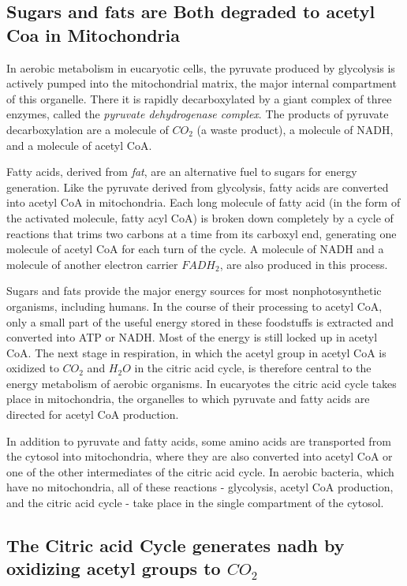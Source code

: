 \subsection{Sugars and fats are Both degraded to acetyl Coa in Mitochondria}

In aerobic metabolism in eucaryotic cells, the pyruvate produced by
glycolysis is actively pumped into the mitochondrial matrix, the major
internal compartment of this organelle. There it is
rapidly decarboxylated by a giant complex of three enzymes, called the
\textit{pyruvate dehydrogenase complex}. The products of pyruvate decarboxylation
are a molecule of $CO_2$ (a waste product), a molecule of NADH, and a
molecule of acetyl CoA.

Fatty acids, derived from \textit{fat}, are an alternative fuel to sugars for energy
generation. Like the pyruvate derived from glycolysis, fatty acids are converted
into acetyl CoA in mitochondria. Each long molecule of fatty acid
(in the form of the activated molecule, fatty acyl CoA) is broken down
completely by a cycle of reactions that trims two carbons at a time from
its carboxyl end, generating one molecule of acetyl CoA for each turn of
the cycle. A molecule of NADH and a molecule of another electron carrier
$FADH_2$, are also produced in this process.

Sugars and fats provide the major energy sources for most nonphotosynthetic
organisms, including humans. In the course of their processing to
acetyl CoA, only a small part of the useful energy stored in these foodstuffs
is extracted and converted into ATP or NADH. Most of the energy is
still locked up in acetyl CoA. The next stage in respiration, in which the
acetyl group in acetyl CoA is oxidized to $CO_2$ and $H_{2}O$ in the citric acid
cycle, is therefore central to the energy metabolism of aerobic organisms.
In eucaryotes the citric acid cycle takes place in mitochondria, the
organelles to which pyruvate and fatty acids are directed for acetyl CoA
production.

In addition to pyruvate and fatty acids, some amino acids are transported
from the cytosol into mitochondria, where they are also converted into
acetyl CoA or one of the other intermediates of the citric acid cycle.
In aerobic bacteria, which have no mitochondria, all of these reactions
- glycolysis, acetyl CoA production, and the citric acid cycle - take
place in the single compartment of the cytosol.

\subsection{The Citric acid Cycle generates nadh by oxidizing acetyl groups to $CO_2$}

